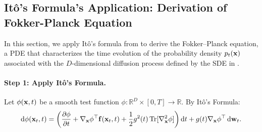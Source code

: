 




\subsection{It\^o's Formula's Application: Derivation of Fokker-Planck Equation}\label{subsec:rigorous-proof-fpe}
In this section, we apply It\^o's formula from  to derive the Fokker–Planck equation, a PDE that characterizes the time evolution of the probability density $ p_t({\mathbf{x}}) $ associated with the $ D $-dimensional diffusion process defined by the SDE in .

\paragraph{Step 1: Apply It\^o's Formula.}
Let $\phi({\mathbf{x}}, t)$ be a smooth test function $\phi \colon \mathbb{R}^D \times [0, T] \to \mathbb{R}$. By It\^o’s Formula:
\[
\mathop{}\!\mathrm{d} \phi({\mathbf{x}}_t, t) = \left( \frac{\partial \phi}{\partial t} + \nabla_{{\mathbf{x}}} \phi^\top {\mathbf{f}}({\mathbf{x}}_t, t) + \frac{1}{2} g^2(t) \operatorname{Tr}[\nabla_{{\mathbf{x}}}^2 \phi] \right) \mathop{}\!\mathrm{d} t + g(t) \nabla_{{\mathbf{x}}} \phi^\top \mathop{}\!\mathrm{d} {\mathbf{w}}_t.
\]
